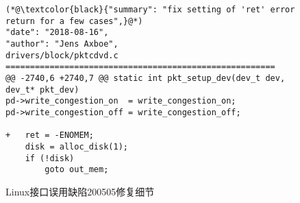 \begin{figure}[t]
	\centering
	\begin{lstlisting}
(*@\textcolor{black}{"summary": "fix setting of 'ret' error return for a few cases",}@*)
"date": "2018-08-16",
"author": "Jens Axboe",
drivers/block/pktcdvd.c
=======================================================
@@ -2740,6 +2740,7 @@ static int pkt_setup_dev(dev_t dev, dev_t* pkt_dev)
pd->write_congestion_on  = write_congestion_on;
pd->write_congestion_off = write_congestion_off;

+	ret = -ENOMEM;
	disk = alloc_disk(1);
	if (!disk)
		goto out_mem;
	\end{lstlisting}
	\caption{
		Linux接口误用缺陷200505修复细节
	}
	\label{fig:4-4-linux-example-fix}
\end{figure}